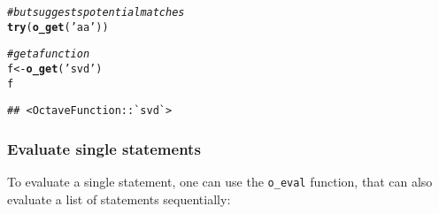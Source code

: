 \documentclass[english,10pt,a4paper]{article}\usepackage[]{graphicx}\usepackage[]{color}
\makeatletter
\newcommand{\hlstr}[1]{\textcolor[rgb]{0.192,0.494,0.8}{#1}}%
\newcommand{\hlcom}[1]{\textcolor[rgb]{0.678,0.584,0.686}{\textit{#1}}}%
\newcommand{\hlstd}[1]{\textcolor[rgb]{0.345,0.345,0.345}{#1}}%
\newcommand{\hlkwb}[1]{\textcolor[rgb]{0.69,0.353,0.396}{#1}}%
\newcommand{\hlkwd}[1]{\textcolor[rgb]{0.737,0.353,0.396}{\textbf{#1}}}%
\newenvironment{kframe}{%
 \def\at@end@of@kframe{}%
 \ifinner\ifhmode%
  \def\at@end@of@kframe{\end{minipage}}%
  \begin{minipage}{\columnwidth}%
 \fi\fi%
 \def\FrameCommand##1{\hskip\@totalleftmargin \hskip-\fboxsep
 \colorbox{shadecolor}{##1}\hskip-\fboxsep
     \hskip-\linewidth \hskip-\@totalleftmargin \hskip\columnwidth}%
 \MakeFramed {\advance\hsize-\width
   \@totalleftmargin\z@ \linewidth\hsize
   \@setminipage}}%
 {\par\unskip\endMakeFramed%
 \at@end@of@kframe}
\newenvironment{knitrout}{}{} %
\let\code=\texttt
\makeatother
\begin{document}
\begin{knitrout}
\begin{kframe}
{\ttfamily\noindent\bfseries\color{errorcolor}{\#\# Error: RcppOctave::o\_get - Could not find an Octave object named 'xxxxx'.}}\begin{alltt}
\hlcom{# but suggests potential matches}
\hlkwd{try}\hlstd{(} \hlkwd{o_get}\hlstd{(}\hlstr{'aa'}\hlstd{) )}
\end{alltt}


{\ttfamily\noindent\bfseries\color{errorcolor}{\#\# Error: RcppOctave::o\_get - Could not find an Octave object named 'aa'.\\\#\#\ \ \ \ \ \ \ \ Match(es): aaa aab}}\begin{alltt}
\hlcom{# get a function}
\hlstd{f} \hlkwb{<-} \hlkwd{o_get}\hlstd{(}\hlstr{'svd'}\hlstd{)}
\hlstd{f}
\end{alltt}
\begin{verbatim}
## <OctaveFunction::`svd`>
\end{verbatim}
\end{kframe}
\end{knitrout}

\subsubsection{Evaluate single statements}

To evaluate a single statement, one can use the \code{o\_eval} function, that
can also evaluate a list of statements sequentially:
\end{document}

